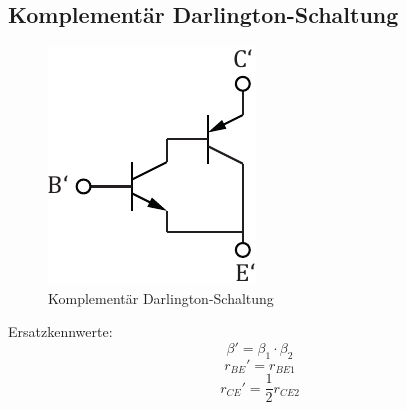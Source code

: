 \subsection{Komplementär Darlington-Schaltung}
\begin{figure}[h!]
	\centering
	\includegraphics[scale = 0.6]{../fig/darlington_komp.pdf}
	\caption{Komplementär Darlington-Schaltung}
	\label{trans:darlington_komp}
\end{figure}
\noindent
Ersatzkennwerte:
\[ \beta' = \beta_1 \cdot \beta_2 \]
\[ r_{BE}' = r_{BE1} \]
\[ r_{CE}' = \frac{1}{2} r_{CE2} \]
